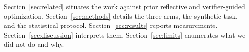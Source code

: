 Section~\ref{sec:related} situates the work against prior reflective
and verifier-guided optimization.  Section~\ref{sec:methods} details
the three arms, the synthetic task, and the statistical protocol.
Section~\ref{sec:results} reports measurements.
Section~\ref{sec:discussion} interprets them.  Section~\ref{sec:limits}
enumerates what we did not do and why.
